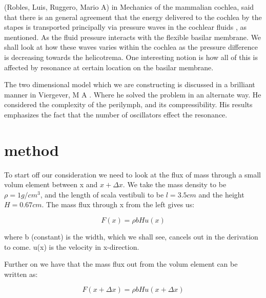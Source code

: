 \documentclass[twoside,twocolumn]{article}
\begin{document}
\bigskip

(Robles, Luis, Ruggero, Mario A) in Mechanics of the mammalian cochlea,  said that there is an general agreement that the energy delivered to the cochlea by the stapes  is transported principally via pressure waves in the cochlear fluids \cite{Robles2001}, as mentioned. As the fluid pressure interacts with the flexible basilar membrane. We shall look at how these waves varies within the cochlea as the pressure difference is decreasing towards the helicotrema. One interesting notion is how all of this is affected by resonance at certain location on the basilar membrane.

\bigskip 

The two dimensional model which we are constructing is discussed in a brilliant manner in Viergever, M A \cite{Viergever1977}. Where he solved the problem in an alternate way. He considered the complexity of the perilymph, and its compressibility. His results emphasizes the fact that the number of oscillators effect the resonance. 



\section{method}
 
 
 To start off our consideration we need to look at the flux of mass through a small volum element between x and $x + \Delta x$. We take the mass density to be $\rho = 1 g/cm^3$, and the length of scala vestibuli to be $l = 3.5cm$ and the height $H = 0.67cm$. The mass flux through x from the left gives us: 
 
 \begin{equation}
 F(x) = \rho b H u(x)
 \end{equation}
 
 where b (constant) is the width, which we shall see, cancels out in the derivation to come. u(x) is the velocity in x-direction.
 
Further on we have that the mass flux out from the volum element can be written as: 

 \begin{equation}
 F(x + \Delta x) = \rho b H u(x + \Delta x)
 \end{equation}
 
\end{document}
